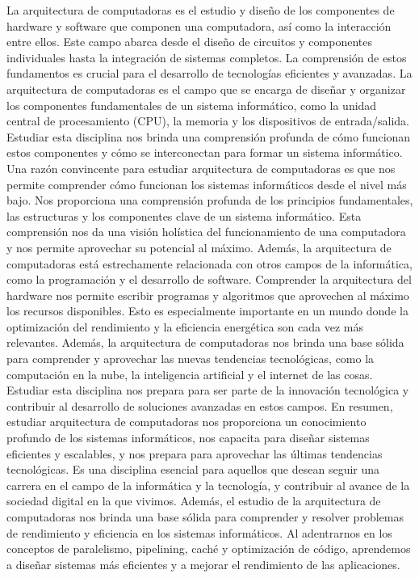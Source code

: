 \documentclass[12pt,twoside]{templates/unerthesis}
\begin{document}
La arquitectura de computadoras es el estudio y diseño de los componentes de hardware y software que componen una computadora, así como la interacción entre ellos. Este campo abarca desde el diseño de circuitos y componentes individuales hasta la integración de sistemas completos. La comprensión de estos fundamentos es crucial para el desarrollo de tecnologías eficientes y avanzadas.
La arquitectura de computadoras es el campo que se encarga de diseñar y organizar los componentes fundamentales de un sistema informático, como la unidad central de procesamiento (CPU), la memoria y los dispositivos de entrada/salida. Estudiar esta disciplina nos brinda una comprensión profunda de cómo funcionan estos componentes y cómo se interconectan para formar un sistema informático.
Una razón convincente para estudiar arquitectura de computadoras es que nos permite comprender cómo funcionan los sistemas informáticos desde el nivel más bajo. Nos proporciona una comprensión profunda de los principios fundamentales, las estructuras y los componentes clave de un sistema informático. Esta comprensión nos da una visión holística del funcionamiento de una computadora y nos permite aprovechar su potencial al máximo.
Además, la arquitectura de computadoras está estrechamente relacionada con otros campos de la informática, como la programación y el desarrollo de software. Comprender la arquitectura del hardware nos permite escribir programas y algoritmos que aprovechen al máximo los recursos disponibles. Esto es especialmente importante en un mundo donde la optimización del rendimiento y la eficiencia energética son cada vez más relevantes.
Además, la arquitectura de computadoras nos brinda una base sólida para comprender y aprovechar las nuevas tendencias tecnológicas, como la computación en la nube, la inteligencia artificial y el internet de las cosas. Estudiar esta disciplina nos prepara para ser parte de la innovación tecnológica y contribuir al desarrollo de soluciones avanzadas en estos campos.
En resumen, estudiar arquitectura de computadoras nos proporciona un conocimiento profundo de los sistemas informáticos, nos capacita para diseñar sistemas eficientes y escalables, y nos prepara para aprovechar las últimas tendencias tecnológicas. Es una disciplina esencial para aquellos que desean seguir una carrera en el campo de la informática y la tecnología, y contribuir al avance de la sociedad digital en la que vivimos.
Además, el estudio de la arquitectura de computadoras nos brinda una base sólida para comprender y resolver problemas de rendimiento y eficiencia en los sistemas informáticos. Al adentrarnos en los conceptos de paralelismo, pipelining, caché y optimización de código, aprendemos a diseñar sistemas más eficientes y a mejorar el rendimiento de las aplicaciones.
\end{document}
